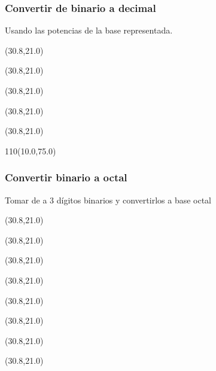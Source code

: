 \documentclass[aspectratio=169]{beamer}
\begin{document}
\begin{frame}[fragile,t]
    \frametitle{Convertir de binario a decimal}
    Usando las potencias de la base representada.
    \begin{textblock}{20}(30.8,21.0)  \end{textblock}
    \begin{textblock}{20}(30.8,21.0)  \end{textblock}
    \begin{textblock}{20}(30.8,21.0)  \end{textblock}
    \begin{textblock}{20}(30.8,21.0)  \end{textblock}
    \begin{textblock}{20}(30.8,21.0)  \end{textblock}
    \begin{textblock}{110}(10.0,75.0)  \end{textblock}
\end{frame}

\begin{frame}[fragile,t]
    \frametitle{Convertir binario a octal}
    Tomar de a 3 dígitos binarios y convertirlos a base octal
    \begin{textblock}{20}(30.8,21.0)  \end{textblock}
    \begin{textblock}{20}(30.8,21.0)  \end{textblock}
    \begin{textblock}{20}(30.8,21.0)  \end{textblock}
    \begin{textblock}{20}(30.8,21.0)  \end{textblock}
    \begin{textblock}{20}(30.8,21.0)  \end{textblock}
    \begin{textblock}{20}(30.8,21.0)  \end{textblock}
    \begin{textblock}{20}(30.8,21.0)  \end{textblock}
    \begin{textblock}{20}(30.8,21.0)  \end{textblock}
\end{frame}
\end{document}
